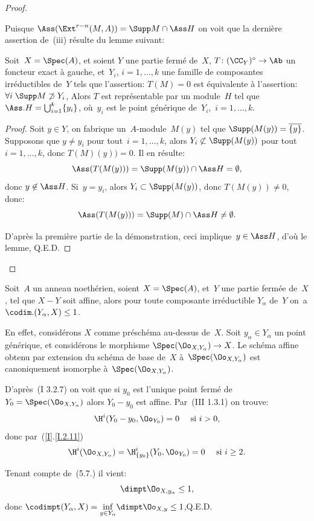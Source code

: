 \begin{proof}
\begin{enumeratei}
Puisque $\Ass(\Ext^{r-n}(M, A))=\Supp M\cap\Ass H$ on voit que la derni\`ere assertion de~(iii) r\'esulte du lemme suivant:
\end{enumeratei}

\begin{lemme} \label{V.3.3} Soit~$X=\Spec(A)$, et soient $Y$ une partie ferm\'e de~$X$, $T\colon (\CC_{Y})^{\circ}\to\Ab$ un foncteur exact \`a gauche, et~$Y_{i}$, $i=1,\dots, k$ une famille de composantes irr\'eductibles de~$Y$ tels que l'assertion: $T(M)=0$ est \'equivalente \`a l'assertion: $\forall i\;\Supp M\not\supset Y_{i}$, Alors $T$ est repr\'esentable par un module~$H$ tel que $\Ass.H=\bigcup_{i=1}^{k}\{y_{i}\}$, o\`u~$y_{i}$ est le point g\'en\'erique de~$Y_{i}$,~$i=1,\dots, k$.
\end{lemme}

\begin{proof}
Soit $y\in Y$, on fabrique un~$A$-module~$M(y)$ tel que $\Supp(M(y))=\overline{\{ y\} }$. Supposons que $y\neq y_{i}$ pour tout~$i=1,\dots, k$, alors $Y_{i}\not\subset\Supp(M(y))$ pour tout~$i=1,\dots, k$, donc $T(M)(y))=0$. Il en r\'esulte:
$$
\Ass(T(M(y)))=\Supp(M(y))\cap\Ass H=\emptyset,
$$
donc $y\not\in\Ass H$. Si~$y=y_{i}$, alors $Y_{i}\subset\Supp(M(y))$, donc $T(M(y))\neq 0$, donc:
$$
\Ass(T(M(y)))=\Supp(M)\cap\Ass H\neq\emptyset.
$$

D'apr\`es la premi\`ere partie de la d\'emonstration, ceci implique~$y\in\Ass H$, d'o\`u le lemme, \hfill Q.E.D.
\skipqed
\end{proof}
\skipqed
\end{proof}

\begin{exemple} \label{V.3.4}
Soit~$A$ un anneau noeth\'erien, soient $X=\Spec(A)$, et~$Y$ une partie ferm\'ee de~$X$, tel que $X-Y$ soit affine, alors pour toute composante irr\'eductible $Y_{\alpha}$ de~$Y$ on~a $\codim.(Y_{\alpha}, X)\leq 1$.

En effet, consid\'erons $X$ comme pr\'esch\'ema au-dessus de~$X$. Soit $y_{\alpha}\in Y_{\alpha}$ un point g\'en\'erique, et consid\'erons le morphisme $\Spec(\Oo_{X, Y_{\alpha}})\to X$. Le sch\'ema affine obtenu par extension du sch\'ema de base de~$X$ \`a~$\Spec(\Oo_{X, Y_{\alpha}})$ est canoniquement isomorphe \`a~$\Spec(\Oo_{X, Y_{\alpha}})$.

D'apr\`es~(\EGA I 3.2.7) on voit que si $y_{0}$ est l'unique point ferm\'e de~$Y_{0}=\Spec(\Oo_{X, Y_{\alpha}})$ alors $Y_{0}- y_{0}$ est affine. Par~(\EGA III 1.3.1) on trouve:
$$
\H^{i}(Y_{0}- y_{0}, \Oo_{Y_{0}})=0\quad\textrm{ si }i>0,
$$
donc par~(\ref{I}.\ref{I.2.11})
$$
\H^{i}(\Oo_{X, Y_{\alpha}})=\H_{\{ y_{0}\} }^{i}(Y_{0}, \Oo_{Y_{0}})=0\quad\textrm{ si }i\geq 2.
$$

Tenant compte de~(5.7.) il vient:
$$
\dimpt \Oo_{X, y_{\alpha}}\leq 1,
$$
donc $\codimpt (Y_{\alpha}, X)=\underset{y\in Y_{\alpha}}{\inf}\dimpt \Oo_{X, y}\leq 1$,\hfill Q.E.D.
\end{exemple}


